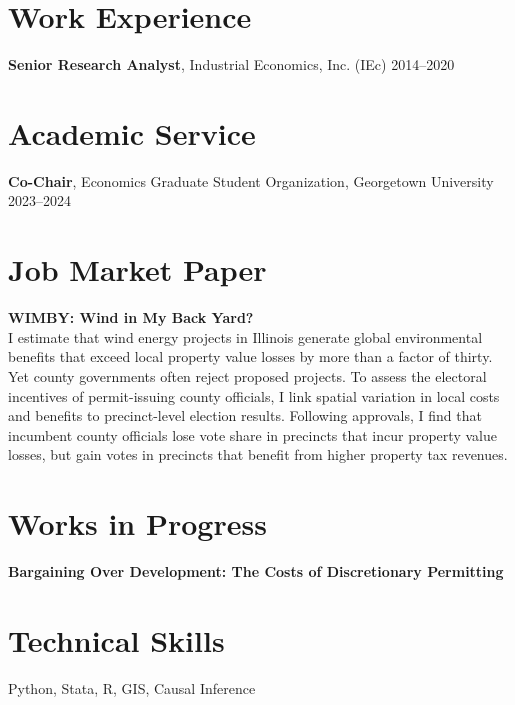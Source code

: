\documentclass[11pt]{article}
\begin{document}
\section*{Work Experience}

\textbf{Senior Research Analyst}, Industrial Economics, Inc. (IEc) \hfill 2014–2020

\section*{Academic Service}

\textbf{Co-Chair}, Economics Graduate Student Organization, Georgetown University \hfill 2023–2024

\section*{Job Market Paper}

\textbf{WIMBY: Wind in My Back Yard?} \\
I estimate that wind energy projects in Illinois generate global environmental benefits that exceed local property value losses by more than a factor of thirty. Yet county governments often reject proposed projects. To assess the electoral incentives of permit-issuing county officials, I link spatial variation in local costs and benefits to precinct-level election results. Following approvals, I find that incumbent county officials lose vote share in precincts that incur property value losses, but gain votes in precincts that benefit from higher property tax revenues.

\section*{Works in Progress}
\textbf{Bargaining Over Development: The Costs of Discretionary Permitting}



\section*{Technical Skills}
Python, Stata, R, GIS, Causal Inference

\end{document}
